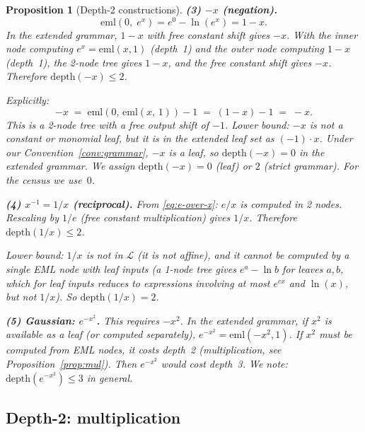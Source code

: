 \documentclass[12pt,a4paper]{article}
\newtheorem{proposition}[theorem]{Proposition}
\theoremstyle{definition}
\theoremstyle{remark}
\begin{document}
\begin{proposition}[Depth-2 constructions]
\medskip
\noindent\textbf{(3) $-x$ (negation).}
\begin{equation}
  \mathrm{eml}(0,\; e^x)
  = e^0 - \ln(e^x)
  = 1 - x.
\end{equation}
In the extended grammar, $1 - x$ with free constant shift gives $-x$.
With the inner node computing $e^x = \mathrm{eml}(x,1)$ (depth~1) and the outer
node computing $1 - x$ (depth~1), the 2-node tree gives $1 - x$, and the
free constant shift gives $-x$.  Therefore $\mathrm{depth}(-x) \leq 2$.

Explicitly:
\begin{equation}
  -x \;=\; \mathrm{eml}(0,\, \mathrm{eml}(x,\,1)) - 1
  \;=\; (1 - x) - 1
  \;=\; -x.  \label{eq:negx}
\end{equation}
This is a 2-node tree with a free output shift of $-1$.
Lower bound: $-x$ is not a constant or monomial leaf, but it \emph{is} in the
extended leaf set as $(-1) \cdot x$.  Under our Convention~\ref{conv:grammar},
$-x$ is a leaf, so $\mathrm{depth}(-x) = 0$ in the extended grammar.  We assign
$\mathrm{depth}(-x) = 0$ (leaf) or $2$ (strict grammar).  For the census we use~$0$.

\medskip
\noindent\textbf{(4) $x^{-1} = 1/x$ (reciprocal).}
From \eqref{eq:e-over-x}: $e/x$ is computed in 2 nodes.  Rescaling by $1/e$
(free constant multiplication) gives $1/x$.  Therefore $\mathrm{depth}(1/x) \leq 2$.

Lower bound: $1/x$ is not in $\mathcal{L}$ (it is not affine), and it cannot be
computed by a single EML node with leaf inputs (a 1-node tree gives $e^a - \ln b$
for leaves $a, b$, which for leaf inputs reduces to expressions involving at most
$e^{cx}$ and $\ln(x)$, but not $1/x$).  So $\mathrm{depth}(1/x) = 2$.

\medskip
\noindent\textbf{(5) Gaussian: $e^{-x^2}$.}
This requires $-x^2$.  In the extended grammar, if $x^2$ is available as a leaf
(or computed separately), $e^{-x^2} = \mathrm{eml}(-x^2, 1)$.
If $x^2$ must be computed from EML nodes, it costs depth~2 (multiplication, see
Proposition~\ref{prop:mul}).  Then $e^{-x^2}$ would cost depth~3.
We note: $\mathrm{depth}(e^{-x^2}) \leq 3$ in general.

\end{proposition}

\subsection{Depth-2: multiplication}
\end{document}
